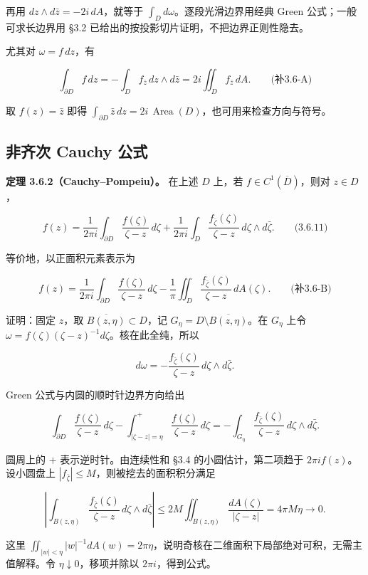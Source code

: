 \documentclass[11pt,a4paper]{article}
\begin{document}
再用 \(dz\wedge d\bar z=-2i\,dA\)，就等于
\(\int_Dd\omega\)。逐段光滑边界用经典 Green 公式；一般可求长边界用 §3.2
已给出的按投影切片证明，不把边界正则性隐去。

尤其对 \(\omega=f\,dz\)，有

\[
\int_{\partial D}f\,dz
=-\int_D f_{\bar z}\,dz\wedge d\bar z
=2i\iint_D f_{\bar z}\,dA.
\qquad\text{(补3.6-A)}
\]

取 \(f(z)=\bar z\) 即得
\(\int_{\partial D}\bar z\,dz=2i\,\operatorname{Area}(D)\)，也可用来检查方向与符号。

\subsection{非齐次 Cauchy
公式}\label{ch03-s6-ux975eux9f50ux6b21-cauchy-ux516cux5f0f}

\textbf{定理 3.6.2（Cauchy--Pompeiu）。} 在上述 \(D\) 上，若
\(f\in C^1(\overline D)\)，则对 \(z\in D\)，

\[
f(z)=\frac1{2\pi i}\int_{\partial D}\frac{f(\zeta)}{\zeta-z}\,d\zeta
+\frac1{2\pi i}\int_D\frac{f_{\bar\zeta}(\zeta)}{\zeta-z}\,d\zeta\wedge d\bar\zeta.
\qquad\text{(3.6.11)}
\]

等价地，以正面积元素表示为

\[
f(z)=\frac1{2\pi i}\int_{\partial D}\frac{f(\zeta)}{\zeta-z}\,d\zeta
-\frac1\pi\iint_D\frac{f_{\bar\zeta}(\zeta)}{\zeta-z}\,dA(\zeta).
\qquad\text{(补3.6-B)}
\]

证明：固定 \(z\)，取 \(\overline{B(z,\eta)}\subset D\)，记
\(G_\eta=D\setminus\overline{B(z,\eta)}\)。在 \(G_\eta\) 上令
\(\omega=f(\zeta)(\zeta-z)^{-1}d\zeta\)。核在此全纯，所以

\[
d\omega=-\frac{f_{\bar\zeta}(\zeta)}{\zeta-z}\,d\zeta\wedge d\bar\zeta.
\]

Green 公式与内圆的顺时针边界方向给出

\[
\int_{\partial D}\frac{f(\zeta)}{\zeta-z}\,d\zeta
-\int_{|\zeta-z|=\eta}^{+}\frac{f(\zeta)}{\zeta-z}\,d\zeta
=-\int_{G_\eta}\frac{f_{\bar\zeta}(\zeta)}{\zeta-z}\,d\zeta\wedge d\bar\zeta.
\]

圆周上的 \(+\) 表示逆时针。由连续性和 §3.4 的小圆估计，第二项趋于
\(2\pi i f(z)\)。设小圆盘上
\(|f_{\bar\zeta}|\le M\)，则被挖去的面积积分满足

\[
\left|\int_{B(z,\eta)}\frac{f_{\bar\zeta}(\zeta)}{\zeta-z}\,d\zeta\wedge d\bar\zeta\right|
\le2M\iint_{B(z,\eta)}\frac{dA(\zeta)}{|\zeta-z|}
=4\pi M\eta\longrightarrow0.
\]

这里
\(\iint_{|w|<\eta}|w|^{-1}dA(w)=2\pi\eta\)，说明奇核在二维面积下局部绝对可积，无需主值解释。令
\(\eta\downarrow0\)，移项并除以 \(2\pi i\)，得到公式。
\end{document}
